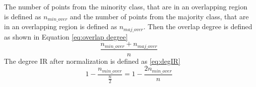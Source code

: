 The number of points from the minority class, that are in an overlapping region is defined as $n_{min\_over}$ and the number of points from the majority class, that are in an overlapping region is defined as $n_{maj\_over}$. Then the overlap degree is defined as shown in Equation \ref{eq:overlap degree}
\begin{equation}
\label{eq:overlap degree}
\frac{n_{min\_over} + n_{maj\_over}}{n}
\end{equation}
The degree IR after normalization is defined as \ref{eq:degIR}
\begin{equation}
\label{eq:degIR}
1-\frac{n_{min\_over}}{\frac{n}{2}}=1-\frac{2n_{min\_over}}{n}
\end{equation}

